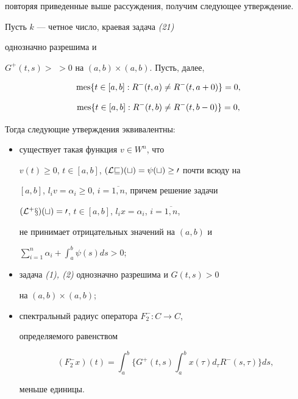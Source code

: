повторяя приведенные выше рассуждения, получим следующее утверждение. 


 


\begin{thm} Пусть $k$ --- четное число, краевая задача {\em (21)} 


однозначно разрешима и 


$G^+(t,s)>$ $>0$ на $(a,b)\times(a,b)$. Пусть, далее, 




$$ 


\mes\{t\in[a,b]:R^-(t,a)\ne R^-(t,a+0)\}=0, 


$$ 


$$ 


\mes\{t\in[a,b]:R^-(t,b)\ne R^-(t,b-0)\}=0, 


$$ 


Тогда следующие утверждения эквивалентны: 


\begin{itemize} 


\item[1)] существует такая функция $v\in W^n$, что 


$v(t)\ge 0$, $t\in[a,b]$, $(\cal Lv)(t)=\psi(t)\ge 0$ почти всюду на 


$[a,b]$, $l_iv=\alpha_i\ge 0$, $i=\overline{1,n}$, причем решение задачи 


$(\cal L^+x)(t)=0$, $t\in[a,b]$, $l_ix=\alpha_i$, $i=\overline{1,n}$, 


не принимает отрицательных значений на $(a,b)$ и 


$\sum^n_{i=1}\alpha_i+\int^b_a\psi(s)ds>0$; 


\item[2)] задача {\em (1), (2)} однозначно разрешима и $G(t,s)>0$ 


на $(a,b)\times(a,b)$; 


\item[3)] спектральный радиус оператора $F^-_2:C\to C$, 


определяемого равенством 


$$ 


(F^-_2x)(t)=\int^b_a\biggl\{G^+(t,s)\int^b_ax(\tau)d_\tau R^-(s,\tau) 


\biggr\}ds, 


$$ 


меньше единицы. 


\end{itemize} 


\end{thm} 


